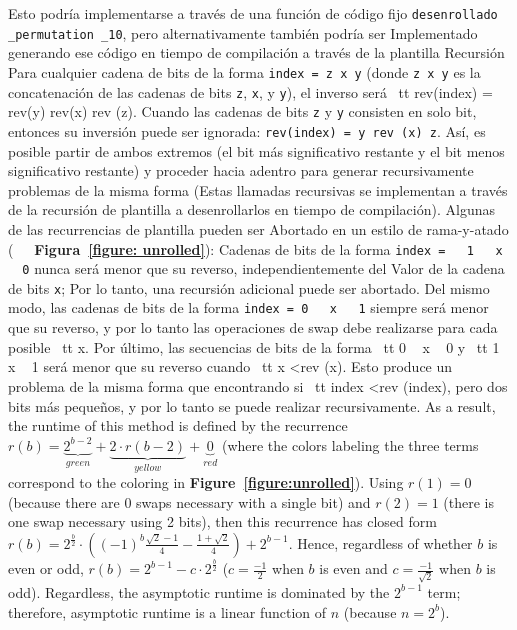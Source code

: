 ﻿\documentclass[10pt]{article}
\begin{document}
{Esto podría implementarse a través de una función de código fijo {\tt desenrollado \_permutation \_10}, pero alternativamente también podría ser
Implementado generando ese código en tiempo de compilación a través de la plantilla
Recursión Para cualquier cadena de bits de la forma {\tt index = z x y} (donde
{\tt z x y} es la concatenación de las cadenas de bits {\tt z}, {\tt x}, y
{\tt y}), el inverso será {\ tt rev(index) = rev(y) rev(x) rev (z)}. Cuando las cadenas de bits {\tt z} y {\tt y} consisten en solo bit, entonces su inversión puede ser ignorada: {\tt rev(index) = y rev (x) z}. Así, es posible partir de ambos extremos (el bit más significativo restante y el bit menos significativo restante) y proceder hacia adentro para generar recursivamente problemas de la misma forma (Estas llamadas recursivas se implementan a través de la recursión de plantilla a desenrollarlos en tiempo de compilación). Algunas de las recurrencias de plantilla pueden ser
Abortado en un estilo de rama-y-atado ({\bf
  Figura~\ref {figure: unrolled}}): Cadenas de bits de la forma {\tt index =
  1 ~ x ~ 0} nunca será menor que su reverso, independientemente del
Valor de la cadena de bits {\tt x}; Por lo tanto, una recursión adicional puede ser abortado. Del mismo modo, las cadenas de bits de la forma {\tt index = 0 ~ x ~ 1} siempre será menor que su reverso, y por lo tanto las operaciones de swap debe realizarse para cada posible {\ tt x}. Por último, las secuencias de bits de la forma {\ tt 0 ~ x ~ 0} y {\ tt 1 ~ x ~ 1} será menor que su reverso cuando {\ tt x <rev (x)}. Esto produce un problema de la misma forma que encontrando si {\ tt index <rev (index)}, pero dos bits más pequeños, y por lo tanto se puede realizar recursivamente.
As a result, the runtime of this method is defined by the recurrence
$r(b) = \underbrace{2^{b-2}}_{green} + \underbrace{2 \cdot
  r(b-2)}_{yellow} + \underbrace{0}_{red}$ (where the colors labeling
the three terms correspond to the coloring in {\bf
  Figure~\ref{figure:unrolled}}). Using $r(1) = 0$ (because there are
0 swaps necessary with a single bit) and $r(2) = 1$ (there is one swap
necessary using 2 bits), then this recurrence has closed form $r(b) =
2^{\frac{b}{2}} \cdot \left( {(-1)}^b \frac{\sqrt{2}-1}{4} - \frac{1 +
  \sqrt{2}}{4} \right) + 2^{b-1}$. Hence, regardless of whether $b$ is
even or odd, $r(b) = 2^{b-1} - c \cdot 2^{\frac{b}{2}}$
($c=\frac{-1}{2}$ when $b$ is even and $c=\frac{-1}{\sqrt{2}}$ when
$b$ is odd). Regardless, the asymptotic runtime is dominated by the
$2^{b-1}$ term; therefore, asymptotic runtime is a linear function of
$n$ (because $n = 2^b$).

}
\end{document}
